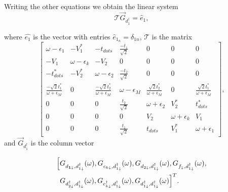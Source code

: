 \documentclass[showpacs,aps,prb,reprint,superscriptaddress]{revtex4-1}
\begin{document}
Writing the other equations  we obtain the  linear system
\begin{equation}
    \mathcal{T} \vec{G}_{d^\dagger_1} = \hat{e}_1,
\end{equation}

\noindent where $\hat{e_1}$ is the vector with entries  $\hat{e}_{1_n} =\delta_{1n}$, $\mathcal{T}$ is the  matrix 
\begin{equation}
\left[\begin{array}{ccccccc}
\omega-\epsilon_{1} & -V_{1}^{*} & -t_{dots} & \frac{-t_{1}}{\sqrt{2}} & 0 & 0 & 0\\
-V_{1} & \omega-\epsilon_{k} & -V_{2} & 0 & 0 & 0 & 0\\
-t_{dots}^{*} & -V_{2}^{*} & \omega-\epsilon_{2} & \frac{-t_{2}}{\sqrt{2}} & 0 & 0 & 0\\
\frac{-\sqrt{2}t_{1}^{*}}{\omega+\epsilon_{M}} & 0 & \frac{-\sqrt{2}t_{2}^{*}}{\omega+\epsilon_{M}} & \omega-\epsilon_{M} & \frac{\sqrt{2}t_{2}^{*}}{\omega+\epsilon_{M}} & 0 & \frac{\sqrt{2}t_{1}^{*}}{\omega+\epsilon_{M}}\\
0 & 0 & 0 & \frac{t_{2}}{\sqrt{2}} & \omega+\epsilon_{2} & V_{2}^{*} & t_{dots}^{*}\\
0 & 0 & 0 & 0 & V_{2} & \omega+\epsilon_{k} & V_{1}\\
0 & 0 & 0 & \frac{t_{1}}{\sqrt{2}} & t_{dots} & V_{1}^{*} & \omega+\epsilon_{1}
\end{array}\right],
\label{eq:TransportMatrix}
\end{equation}
 \noindent and $\vec{G}_{d^\dagger_1}$  is the column vector
 
 \begin{align*}
    \Big[ &  G_{d_{\mathbf{1\downarrow}},d_{1\downarrow}^{\dagger}}(\omega),G_{c_{k\downarrow},d_{1\downarrow}^{\dagger}}(\omega),G_{d_{2\downarrow},d_{1\downarrow}^{\dagger}}(\omega),G_{f_{\downarrow},  d_{1\downarrow}^{\dagger}}(\omega), \\ & G_{d_{2\downarrow}^{\dagger},d_{1\downarrow}^{\dagger}}(\omega),G_{c_{k\downarrow}^{\dagger},d_{1\downarrow}^{\dagger}}(\omega),G_{d_{1\downarrow}^{\dagger},d_{1\downarrow}^{\dagger}}(\omega) \Big]^T.
 \end{align*}
 
\end{document}
